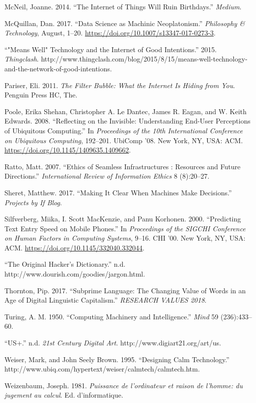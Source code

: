 \documentclass[]{article}
\begin{document}
\leavevmode\hypertarget{ref-McNeil2014}{}%
McNeil, Joanne. 2014. ``The Internet of Things Will Ruin Birthdays.''
\emph{Medium}.

\leavevmode\hypertarget{ref-McQuillan2017}{}%
McQuillan, Dan. 2017. ``Data Science as Machinic Neoplatonism.''
\emph{Philosophy \& Technology}, August, 1--20.
\url{https://doi.org/10.1007/s13347-017-0273-3}.

\leavevmode\hypertarget{ref-2015}{}%
``"Means Well" Technology and the Internet of Good Intentions.'' 2015.
\emph{Thingclash}.
http://www.thingclash.com/blog/2015/8/15/means-well-technology-and-the-network-of-good-intentions.

\leavevmode\hypertarget{ref-Pariser2011}{}%
Pariser, Eli. 2011. \emph{The Filter Bubble: What the Internet Is Hiding
from You}. Penguin Press HC, The.

\leavevmode\hypertarget{ref-Poole2008}{}%
Poole, Erika Shehan, Christopher A. Le Dantec, James R. Eagan, and W.
Keith Edwards. 2008. ``Reflecting on the Invisible: Understanding
End-User Perceptions of Ubiquitous Computing.'' In \emph{Proceedings of
the 10th International Conference on Ubiquitous Computing}, 192--201.
UbiComp '08. New York, NY, USA: ACM.
\url{https://doi.org/10.1145/1409635.1409662}.

\leavevmode\hypertarget{ref-Ratto2007}{}%
Ratto, Matt. 2007. ``Ethics of Seamless Infrastructures : Resources and
Future Directions.'' \emph{International Review of Information Ethics} 8
(8):20--27.

\leavevmode\hypertarget{ref-Sheret2017}{}%
Sheret, Matthew. 2017. ``Making It Clear When Machines Make Decisions.''
\emph{Projects by If Blog}.

\leavevmode\hypertarget{ref-Silfverberg2000}{}%
Silfverberg, Miika, I. Scott MacKenzie, and Panu Korhonen. 2000.
``Predicting Text Entry Speed on Mobile Phones.'' In \emph{Proceedings
of the SIGCHI Conference on Human Factors in Computing Systems}, 9--16.
CHI '00. New York, NY, USA: ACM.
\url{https://doi.org/10.1145/332040.332044}.

\leavevmode\hypertarget{ref-zotero-52}{}%
``The Original Hacker's Dictionary.'' n.d.
http://www.dourish.com/goodies/jargon.html.

\leavevmode\hypertarget{ref-Thornton2017}{}%
Thornton, Pip. 2017. ``Subprime Language: The Changing Value of Words in
an Age of Digital Linguistic Capitalism.'' \emph{RESEARCH VALUES 2018}.

\leavevmode\hypertarget{ref-Turing1950}{}%
Turing, A. M. 1950. ``Computing Machinery and Intelligence.''
\emph{Mind} 59 (236):433--60.

\leavevmode\hypertarget{ref-zotero-30}{}%
``US+.'' n.d. \emph{21st Century Digital Art}.
http://www.digiart21.org/art/us.

\leavevmode\hypertarget{ref-Weiser1995}{}%
Weiser, Mark, and John Seely Brown. 1995. ``Designing Calm Technology.''
http://www.ubiq.com/hypertext/weiser/calmtech/calmtech.htm.

\leavevmode\hypertarget{ref-Weizenbaum1981}{}%
Weizenbaum, Joseph. 1981. \emph{Puissance de l'ordinateur et raison de
l'homme: du jugement au calcul}. Ed. d'informatique.
\end{document}

